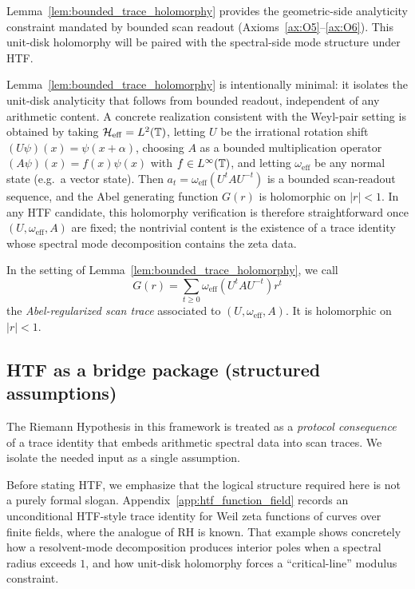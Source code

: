 Lemma~\ref{lem:bounded_trace_holomorphy} provides the geometric-side analyticity constraint mandated by bounded scan readout (Axioms~\ref{ax:O5}--\ref{ax:O6}).
This unit-disk holomorphy will be paired with the spectral-side mode structure under HTF.

\begin{remark}
\label{rem:concrete_holomorphy_models}
Lemma~\ref{lem:bounded_trace_holomorphy} is intentionally minimal: it isolates the unit-disk analyticity that follows from bounded readout, independent of any arithmetic content.
A concrete realization consistent with the Weyl-pair setting is obtained by taking $\mathcal{H}_{\mathrm{eff}}=L^2(\mathbb{T})$, letting $U$ be the irrational rotation shift $(U\psi)(x)=\psi(x+\alpha)$, choosing $A$ as a bounded multiplication operator $(A\psi)(x)=f(x)\psi(x)$ with $f\in L^\infty(\mathbb{T})$, and letting $\omega_{\mathrm{eff}}$ be any normal state (e.g.\ a vector state).
Then $a_t=\omega_{\mathrm{eff}}(U^t A U^{-t})$ is a bounded scan-readout sequence, and the Abel generating function $G(r)$ is holomorphic on $|r|<1$.
In any HTF candidate, this holomorphy verification is therefore straightforward once $(U,\omega_{\mathrm{eff}},A)$ are fixed; the nontrivial content is the existence of a trace identity whose spectral mode decomposition contains the zeta data.
\end{remark}

\begin{definition}
\label{def:abel_scan_trace}
In the setting of Lemma~\ref{lem:bounded_trace_holomorphy}, we call
\[
G(r)=\sum_{t\ge 0}\omega_{\mathrm{eff}}\!\left(U^t A U^{-t}\right) r^t
\]
the \emph{Abel-regularized scan trace} associated to $(U,\omega_{\mathrm{eff}},A)$.
It is holomorphic on $|r|<1$.
\end{definition}

\subsection{HTF as a bridge package (structured assumptions)}
\label{sec:htf_assumption}

The Riemann Hypothesis in this framework is treated as a \emph{protocol consequence} of a trace identity that embeds arithmetic spectral data into scan traces.
We isolate the needed input as a single assumption.

\begin{remark}
\label{rem:htf_function_field_preview}
Before stating HTF, we emphasize that the logical structure required here is not a purely formal slogan.
Appendix~\ref{app:htf_function_field} records an unconditional HTF-style trace identity for Weil zeta functions of curves over finite fields, where the analogue of RH is known.
That example shows concretely how a resolvent-mode decomposition produces interior poles when a spectral radius exceeds $1$, and how unit-disk holomorphy forces a ``critical-line'' modulus constraint.
\end{remark}

